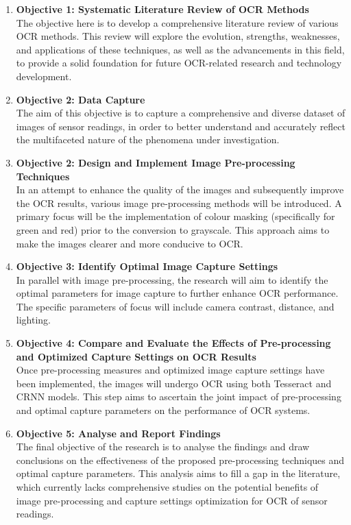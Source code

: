 \begin{enumerate}

    \item \textbf{Objective 1: Systematic Literature Review of OCR Methods}\\
          The objective here is to develop a comprehensive literature review of various OCR methods. This review will explore the evolution, strengths, weaknesses, and applications of these techniques, as well as the advancements in this field, to provide a solid foundation for future OCR-related research and technology development.


    \item \textbf{Objective 2: Data Capture}\\
          The aim of this objective is to capture a comprehensive and diverse dataset of images of sensor readings, in order to better understand and accurately reflect the multifaceted nature of the phenomena under investigation.

    \item \textbf{Objective 2: Design and Implement Image Pre-processing Techniques}\\
          In an attempt to enhance the quality of the images and subsequently improve the OCR results, various image pre-processing methods will be introduced. A primary focus will be the implementation of colour masking (specifically for green and red) prior to the conversion to grayscale. This approach aims to make the images clearer and more conducive to OCR.

    \item \textbf{Objective 3: Identify Optimal Image Capture Settings}\\
          In parallel with image pre-processing, the research will aim to identify the optimal parameters for image capture to further enhance OCR performance. The specific parameters of focus will include camera contrast, distance, and lighting.

    \item \textbf{Objective 4: Compare and Evaluate the Effects of Pre-processing and Optimized Capture Settings on OCR Results}\\
          Once pre-processing measures and optimized image capture settings have been implemented, the images will undergo OCR using both Tesseract and CRNN models. This step aims to ascertain the joint impact of pre-processing and optimal capture parameters on the performance of OCR systems.

    \item \textbf{Objective 5: Analyse and Report Findings}\\
          The final objective of the research is to analyse the findings and draw conclusions on the effectiveness of the proposed pre-processing techniques and optimal capture parameters. This analysis aims to fill a gap in the literature, which currently lacks comprehensive studies on the potential benefits of image pre-processing and capture settings optimization for OCR of sensor readings.
\end{enumerate}

